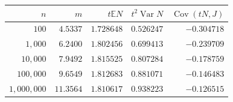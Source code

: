 \begin{tabular}{rrrrr}
\toprule
$n$ & $m$ & $t\mathbb E N$ & $t^2\operatorname{Var}N$ & $\operatorname{Cov}(tN,J)$\\
\midrule
$100$ & $4.5337$ & $1.728648$ & $0.526247$ & $-0.304718$\\
$1,000$ & $6.2400$ & $1.802456$ & $0.699413$ & $-0.239709$\\
$10,000$ & $7.9492$ & $1.815525$ & $0.807284$ & $-0.178759$\\
$100,000$ & $9.6549$ & $1.812683$ & $0.881071$ & $-0.146483$\\
$1,000,000$ & $11.3564$ & $1.810617$ & $0.938223$ & $-0.126515$\\
\bottomrule
\end{tabular}

